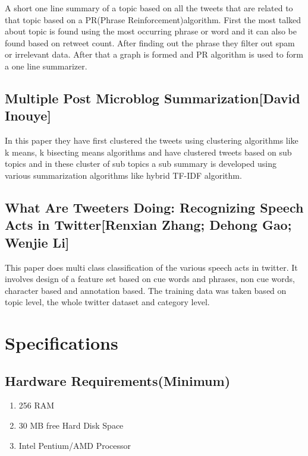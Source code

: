 \documentclass[conference]{IEEEtran}
\begin{document}
\par A short one line summary of a topic based on all the tweets that are related to that topic based on a PR(Phrase Reinforcement)algorithm. First the most talked about topic is found using the most occurring phrase or word and it can also be found based on retweet count. After finding out the phrase they filter out spam or irrelevant data. After that a graph is formed and PR algorithm is used to form a one line summarizer.

\subsection{\textbf{Multiple Post Microblog Summarization[David Inouye]}}

\par In this paper they have first clustered the tweets using clustering algorithms like k means, k bisecting means algorithms and have clustered tweets based on sub topics and in these cluster of sub topics a sub summary is developed using various summarization algorithms like hybrid TF-IDF algorithm.

\subsection{\textbf{What Are Tweeters Doing: Recognizing Speech Acts in Twitter[Renxian Zhang; Dehong Gao; Wenjie Li]}}

\par This paper does multi class classification of the various speech acts in twitter. It involves design of a feature set based on cue words and phrases, non cue words, character based and annotation based. The training data was taken based on topic level, the whole twitter dataset and category level.

\section{\textbf{Specifications}}
\subsection{\textbf{Hardware Requirements(Minimum)}}
\begin{enumerate}
\item{256 RAM}
\item{30 MB free Hard Disk Space}
\item{Intel Pentium/AMD Processor}
\end{enumerate}
\end{document}
